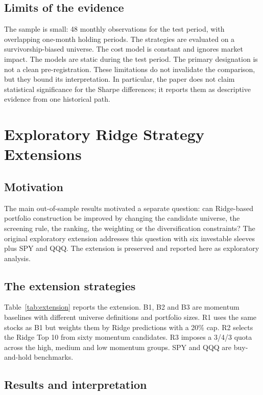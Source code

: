 \documentclass[11pt,a4paper]{article}
\begin{document}
\subsection{Limits of the evidence}

The sample is small: 48 monthly observations for the test period, with overlapping one-month holding periods. The strategies are evaluated on a survivorship-biased universe. The cost model is constant and ignores market impact. The models are static during the test period. The primary designation is not a clean pre-registration. These limitations do not invalidate the comparison, but they bound its interpretation. In particular, the paper does not claim statistical significance for the Sharpe differences; it reports them as descriptive evidence from one historical path.


\section{Exploratory Ridge Strategy Extensions}
\label{sec:extensions}

\subsection{Motivation}

The main out-of-sample results motivated a separate question: can Ridge-based portfolio construction be improved by changing the candidate universe, the screening rule, the ranking, the weighting or the diversification constraints? The original exploratory extension addresses this question with six investable sleeves plus SPY and QQQ. The extension is preserved and reported here as exploratory analysis.

\subsection{The extension strategies}

Table~\ref{tab:extension} reports the extension. B1, B2 and B3 are momentum baselines with different universe definitions and portfolio sizes. R1 uses the same stocks as B1 but weights them by Ridge predictions with a 20\% cap. R2 selects the Ridge Top 10 from sixty momentum candidates. R3 imposes a 3/4/3 quota across the high, medium and low momentum groups. SPY and QQQ are buy-and-hold benchmarks.



\subsection{Results and interpretation}
\end{document}
